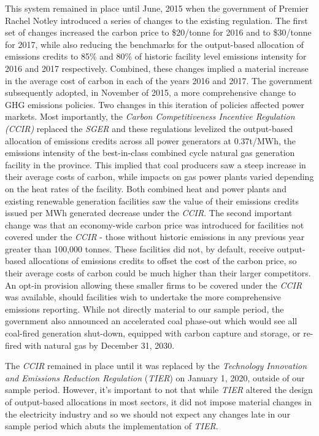 \documentclass[12pt]{article}
\begin{document}
This system remained in place until June, 2015 when the government of Premier Rachel Notley introduced a series of changes to the existing regulation. The first set of changes increased the carbon price to \$20/tonne for 2016 and to \$30/tonne for 2017, while also reducing the benchmarks for the output-based allocation of emissions credits to 85\% and 80\% of historic facility level emissions intensity for 2016 and 2017 respectively. Combined, these changes implied a material increase in the average cost of carbon in each of the years 2016 and 2017. The government subsequently adopted, in November of 2015, a more comprehensive change to GHG emissions policies. Two changes in this iteration of policies affected power markets.  Most importantly, the \textit{Carbon Competitiveness Incentive Regulation (CCIR)} replaced the \emph{SGER} and these regulations levelized the output-based allocation of emissions credits across all power generators at 0.37t/MWh, the emissions intensity of the best-in-class combined cycle natural gas generation facility in the province. This implied that coal producers saw a steep increase in their average costs of carbon, while impacts on gas power plants varied depending on the heat rates of the facility. Both combined heat and power plants and existing renewable generation facilities saw the value of their emissions credits issued per MWh generated decrease under the \emph{CCIR}. The second important change was that an economy-wide carbon price was introduced for facilities not covered under the \emph{CCIR} - those without historic emissions in any previous year greater than 100,000 tonnes. These facilities did not, by default, receive output-based allocations of emissions credits to offset the cost of the carbon price, so their average costs of carbon could be much higher than their larger competitors.  An opt-in provision allowing these smaller firms to be covered under the \emph{CCIR} was available, should facilities wish to undertake the more comprehensive emissions reporting. While not directly material to our sample period, the government also announced an accelerated coal phase-out which would see all coal-fired generation shut-down, equipped with carbon capture and storage, or re-fired with natural gas by December 31, 2030.

The \emph{CCIR} remained in place until it was replaced by the \emph{
Technology Innovation and Emissions Reduction Regulation} (\emph{TIER}) on January 1, 2020, outside of our sample period. However, it's important to not that while \emph{TIER} altered the design of output-based allocations in most sectors, it did not impose material changes in the electricity industry and so we should not expect any changes late in our sample period which abuts the implementation of \emph{TIER}.
\end{document}
